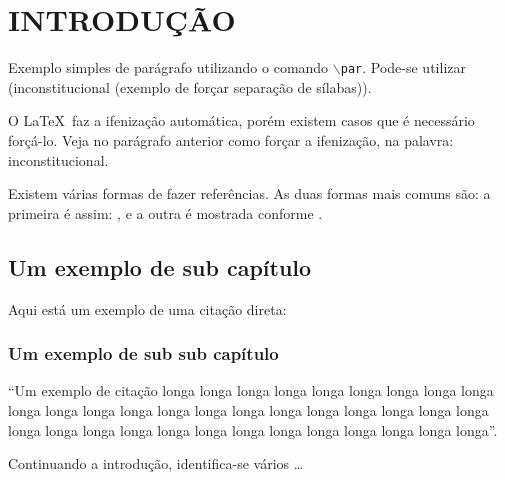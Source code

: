 \chapter{INTRODUÇÃO}

\par Exemplo simples de parágrafo utilizando o comando \texttt{$\backslash$par}. Pode-se utilizar (in\-cons\-titucional (exemplo de forçar separação de sílabas)).

\par O \LaTeX~faz a ifenização automática, porém existem casos que é necessário forçá-lo. Veja no parágrafo anterior como forçar a ifenização, na palavra: inconstitucional.

\par Existem várias formas de fazer referências. As duas formas mais comuns são: a primeira é assim: \cite{revista_patio_pedagoria_ar_livre}, e a outra é mostrada conforme \cite{ecocentro}.


\section{Um exemplo de sub capítulo}


\par Aqui está um exemplo de uma citação direta:

\subsection{Um exemplo de sub sub capítulo}

\begin{citacao}
``Um exemplo de citação longa longa longa longa longa longa longa longa longa longa longa longa longa longa longa longa longa longa longa longa longa longa longa longa longa longa longa longa longa longa longa longa longa longa longa''. \cite{gadotti2003boniteza}
\end{citacao}

\par Continuando a introdução, identifica-se vários \ldots